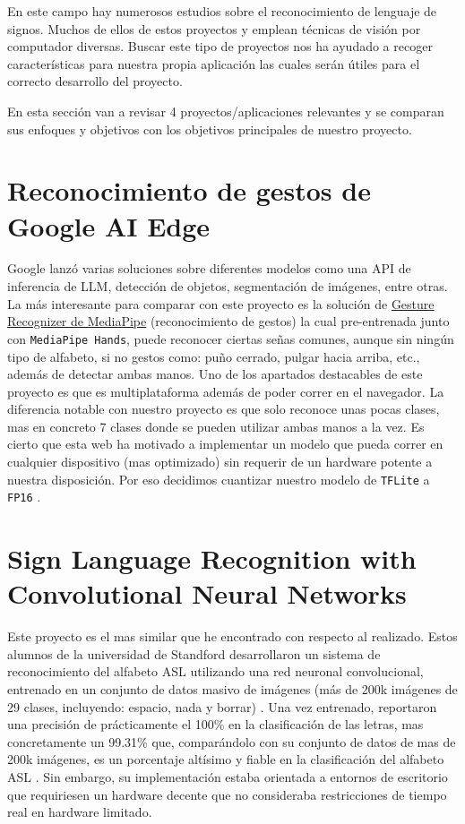 
En este campo hay numerosos estudios sobre el reconocimiento de lenguaje de signos. Muchos de ellos de estos proyectos y emplean técnicas de visión por computador diversas. Buscar este tipo de proyectos nos ha ayudado a recoger características para nuestra propia aplicación las cuales serán útiles para el correcto desarrollo del proyecto.

En esta sección van a revisar 4 proyectos/aplicaciones relevantes y se comparan sus enfoques y objetivos con los objetivos principales de nuestro proyecto.

\section{Reconocimiento de gestos de Google AI Edge}
Google lanzó varias soluciones sobre diferentes modelos como una API de inferencia de LLM, detección de objetos, segmentación de imágenes, entre otras. La más interesante para comparar con este proyecto es la solución de \href{https://ai.google.dev/edge/mediapipe/solutions/vision/gesture_recognizer}{Gesture Recognizer de MediaPipe} (reconocimiento de gestos) la cual pre-entrenada junto con \texttt{MediaPipe Hands}, puede reconocer ciertas señas comunes, aunque sin ningún tipo de alfabeto, si no gestos como: puño cerrado, pulgar hacia arriba, etc., además de detectar ambas manos. Uno de los apartados destacables de este proyecto es que es multiplataforma además de poder correr en el navegador. La diferencia notable con nuestro proyecto es que solo reconoce unas pocas clases, mas en concreto 7 clases donde se pueden utilizar ambas manos a la vez. Es cierto que esta web ha motivado a implementar un modelo que pueda correr en cualquier dispositivo (mas optimizado) sin requerir de un hardware potente a nuestra disposición. Por eso decidimos cuantizar nuestro modelo de \texttt{TFLite} a \texttt{FP16} \cite{web:mediapipe_gesturerecogniser}.

\section{Sign Language Recognition with Convolutional Neural Networks}

Este proyecto es el mas similar que he encontrado con respecto al realizado. Estos alumnos de la universidad de Standford desarrollaron un sistema de reconocimiento del alfabeto ASL utilizando una red neuronal convolucional, entrenado en un conjunto de datos masivo de imágenes (más de 200k imágenes de 29 clases, incluyendo: espacio, nada y borrar) \cite{art:singlenguage_standford}. Una vez entrenado, reportaron una precisión de prácticamente el 100\% en la clasificación de las letras, mas concretamente un 99.31\% que, comparándolo con su conjunto de datos de mas de 200k imágenes, es un porcentaje altísimo y fiable en la clasificación del alfabeto ASL \cite{art:singlenguage_standford}. Sin embargo, su implementación estaba orientada a entornos de escritorio que requiriesen un hardware decente que no consideraba restricciones de tiempo real en hardware limitado.

